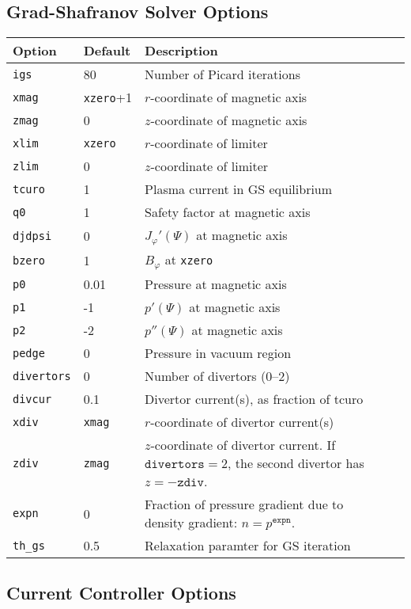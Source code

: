 \documentclass[letterpaper]{book}
\newcommand{\tor}{\varphi}              %
\begin{document}
\subsection{Grad-Shafranov Solver Options}
\begin{tabular}{llll}
  \textbf{Option}&\textbf{Default}&\textbf{Description}\\
  \hline
  \texttt{igs}   & 80     & Number of Picard iterations\\
  \texttt{xmag}  & \texttt{xzero}+1 & $r$-coordinate of magnetic axis\\
  \texttt{zmag}  & 0      & $z$-coordinate of magnetic axis\\
  \texttt{xlim}  & \texttt{xzero}   & $r$-coordinate of limiter\\
  \texttt{zlim}  & 0      & $z$-coordinate of limiter\\
  \texttt{tcuro} & 1      & Plasma current in GS equilibrium\\
  \texttt{q0}    & 1      & Safety factor at magnetic axis\\
  \texttt{djdpsi}& 0      & $J_\tor'(\Psi)$ at magnetic axis\\
  \texttt{bzero} & 1      & $B_\tor$ at \texttt{xzero}\\
  \texttt{p0}    & 0.01   & Pressure at magnetic axis\\
  \texttt{p1}    & -1     & $p'(\Psi)$ at magnetic axis\\
  \texttt{p2}    & -2     & $p''(\Psi)$ at magnetic axis\\
  \texttt{pedge} & 0      & Pressure in vacuum region\\
  \texttt{divertors} & 0  & Number of divertors (0--2)\\
  \texttt{divcur}& 0.1    & Divertor current(s), as fraction of tcuro\\
  \texttt{xdiv}  & \texttt{xmag} & $r$-coordinate of divertor current(s)\\
  \texttt{zdiv}  & \texttt{zmag} & \parbox[t]{3in}{$z$-coordinate of 
    divertor 
    current.  If $\mathtt{divertors} = 2$, the second divertor has 
    $z = -\mathtt{zdiv}$.}\\
  \texttt{expn}  & 0 & \parbox[t]{3in}{Fraction of pressure gradient due to
    density gradient: $n = p^\mathtt{expn}$.}\\
  \texttt{th\_gs} & 0.5 & Relaxation paramter for GS iteration
\end{tabular}


\subsection{Current Controller Options}
\end{document}
